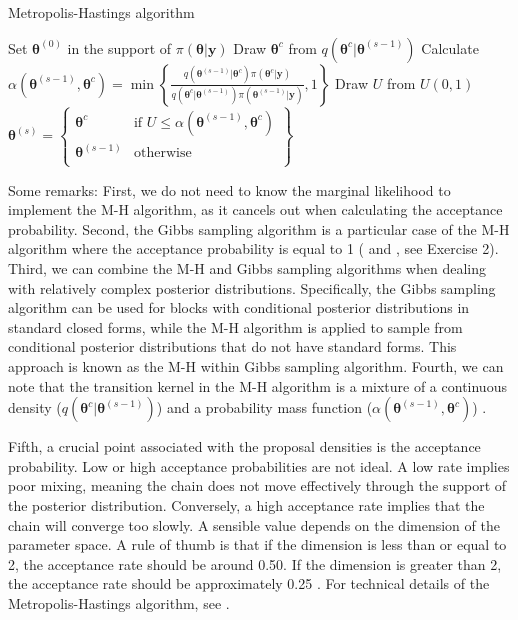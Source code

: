 \begin{algorithm}[h!]
	\caption{Metropolis-Hastings algorithm}\label{Alg:MH}
	\begin{algorithmic}[1]
		\State Set $\bm{\theta}^{(0)}$ in the support of $\pi(\bm{\theta}|\bm{y})$  		 			
		\State Draw $\bm{\theta}^{c}$ from $q(\bm{\theta}^{c}|\bm{\theta}^{(s-1)})$
		\State Calculate $\alpha(\bm{\theta}^{(s-1)}, \bm{\theta}^{c}) = 
		\min\left\{\frac{q(\bm{\theta}^{(s-1)} | \bm{\theta}^{c}) \pi(\bm{\theta}^{c} | \bm{y})}{q(\bm{\theta}^{c} | \bm{\theta}^{(s-1)}) \pi(\bm{\theta}^{(s-1)} | \bm{y})}, 1\right\}$
		\State Draw $U$ from $U(0,1)$
		\State $\bm{\theta}^{(s)}=\begin{Bmatrix}
			\bm{\theta}^{c} & \text{if } U\leq \alpha(\bm{\theta}^{(s-1)}, \bm{\theta}^{c})\\
			\bm{\theta}^{(s-1)} & \text{otherwise}\\
		\end{Bmatrix}$
		\EndFor 
	\end{algorithmic} 
\end{algorithm}

Some remarks: First, we do not need to know the marginal likelihood to implement the M-H algorithm, as it cancels out when calculating the acceptance probability. Second, the Gibbs sampling algorithm is a particular case of the M-H algorithm where the acceptance probability is equal to 1 (\cite{Gelman1992} and \cite[Chap.~10]{robert2011monte}, see Exercise 2). Third, we can combine the M-H and Gibbs sampling algorithms when dealing with relatively complex posterior distributions. Specifically, the Gibbs sampling algorithm can be used for blocks with conditional posterior distributions in standard closed forms, while the M-H algorithm is applied to sample from conditional posterior distributions that do not have standard forms. This approach is known as the M-H within Gibbs sampling algorithm. Fourth, we can note that the transition kernel in the M-H algorithm is a mixture of a continuous density ($q(\bm{\theta}^{c} | \bm{\theta}^{(s-1)})$) and a probability mass function ($\alpha(\bm{\theta}^{(s-1)}, \bm{\theta}^{c})$) \cite{chib1995understanding}. 

Fifth, a crucial point associated with the proposal densities is the acceptance probability. Low or high acceptance probabilities are not ideal. A low rate implies poor mixing, meaning the chain does not move effectively through the support of the posterior distribution. Conversely, a high acceptance rate implies that the chain will converge too slowly. A sensible value depends on the dimension of the parameter space. A rule of thumb is that if the dimension is less than or equal to 2, the acceptance rate should be around 0.50. If the dimension is greater than 2, the acceptance rate should be approximately 0.25 \cite{Roberts1997}. For technical details of the Metropolis-Hastings algorithm, see \cite[Chap.~7]{robert2011monte}.

